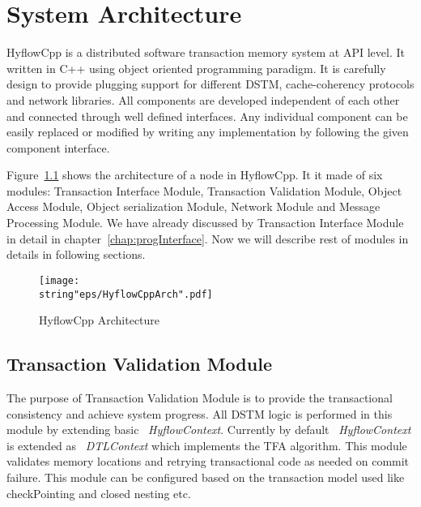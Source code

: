 \documentclass[12pt,english]{report}
\begin{document}

\chapter{System Architecture}\label{chap:sysArch}

HyflowCpp is a distributed software transaction memory system at API level. It written in C++ using object oriented programming paradigm. It is carefully design to provide plugging support for different DSTM, cache-coherency protocols and network libraries. All components are developed independent of each other and connected through well defined interfaces. Any individual component can be easily replaced or modified by writing any implementation by following the given component interface. 

Figure~\ref{Fig:HyflowCppArch} shows the architecture of a node in HyflowCpp. It it made of six modules: Transaction Interface Module, Transaction Validation Module, Object Access Module, Object serialization Module, Network Module and Message Processing Module. We have already discussed by Transaction Interface Module in detail in chapter~\ref{chap:progInterface}. Now we will describe rest of modules in details in following sections.

\begin{figure}
\begin{minipage}
\centering \texttt{[image: \\string"eps/HyflowCppArch".pdf]}
\caption{HyflowCpp Architecture}
\label{Fig:HyflowCppArch}
\end{minipage}
\end{figure}

\section{Transaction Validation Module}

The purpose of Transaction Validation Module is to provide the transactional consistency and achieve system progress. All DSTM logic is performed in this module by extending basic ~\emph{HyflowContext}. Currently by default ~\emph{HyflowContext} is extended as ~\emph{DTLContext} which implements the TFA algorithm. This module validates memory locations and retrying transactional code as needed on commit failure. This module can be configured based on the transaction model used like checkPointing and closed nesting etc. 
\end{document}

